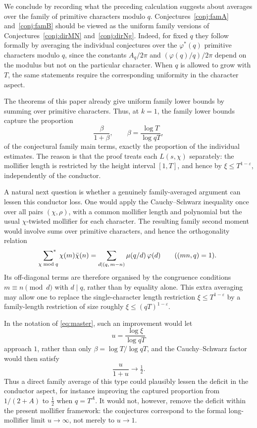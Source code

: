 \documentclass[12pt,a4paper,reqno]{amsart}
\theoremstyle{remark}
\numberwithin{equation}{section}
\begin{document}
We conclude by recording what the preceding calculation suggests about averages over the family of primitive characters modulo $q$. Conjectures~\ref{conj:famA} and~\ref{conj:famB} should be viewed as the uniform family versions of Conjectures~\ref{conj:dirMN} and~\ref{conj:dirNg}. Indeed, for fixed $q$ they follow formally by averaging the individual conjectures over the $\varphi^*(q)$ primitive characters modulo $q$, since the constants $A_q/2\pi$ and $(\varphi(q)/q)/2\pi$ depend on the modulus but not on the particular character. When $q$ is allowed to grow with $T$, the same statements require the corresponding uniformity in the character aspect.

The theorems of this paper already give uniform family lower bounds by summing over primitive characters. Thus, at $k=1$, the family lower bounds capture the proportion
\[
\frac{\beta}{1+\beta},
\qquad
\beta=\frac{\log T}{\log qT},
\]
of the conjectural family main terms, exactly the proportion of the individual estimates. The reason is that the proof treats each $L(s,\chi)$ separately: the mollifier length is restricted by the height interval $[1,T]$, and hence by $\xi\le T^{1-\varepsilon}$, independently of the conductor.

A natural next question is whether a genuinely family-averaged argument can lessen this conductor loss. One would apply the Cauchy--Schwarz inequality once over all pairs $(\chi,\rho)$, with a common mollifier length and polynomial but the usual $\chi$-twisted mollifier for each character. The resulting family second moment would involve sums over primitive characters, and hence the orthogonality relation
\[
\sideset{}{^*}\sum_{\chi\bmod q}\chi(m)\bar\chi(n)=\sum_{d\mid(q,\,m-n)}\mu(q/d)\,\varphi(d)\qquad((mn,q)=1).
\]
Its off-diagonal terms are therefore organised by the congruence conditions $m\equiv n\pmod d$ with $d\mid q$, rather than by equality alone. This extra averaging may allow one to replace the single-character length restriction $\xi\le T^{1-\varepsilon}$ by a family-length restriction of size roughly $\xi\le(qT)^{1-\varepsilon}$.

In the notation of \eqref{eq:master}, such an improvement would let
\[
u=\frac{\log \xi}{\log qT}
\]
approach $1$, rather than only $\beta=\log T/\log qT$, and the Cauchy--Schwarz factor would then satisfy
\[
\frac{u}{1+u}\longrightarrow \tfrac12 .
\]
Thus a direct family average of this type could plausibly lessen the deficit in the conductor aspect, for instance improving the captured proportion from $1/(2+A)$ to $\tfrac12$ when $q=T^{A}$. It would not, however, remove the deficit within the present mollifier framework: the conjectures correspond to the formal long-mollifier limit $u\to\infty$, not merely to $u\to1$.
\end{document}

